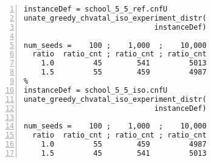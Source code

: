 \begin{table}[h!]
\vspace*{-1.1ex} 

\caption{
A statistical summary of results, based on  experiments that involve
100 isomorphs, initialized with 100 seeds, created from each of the two instances: 
{\tt school\_5\_5\_ref} and {\tt school\_5\_5\_iso}.
For the complete R-code of the stochastic greedy algorithm 
that relies on invoking any number of instance isomorphs, the algorithm
{\tt unate\_greedy\_chvatal\_iso} in
Figure~\ref{fg_bgmc_unate_greedy_chvatal_stoc}a.
However, identical results can also be generated,
using the same seeds,
with the alternative algorithm 
{\tt unate\_greedy\_chvatal\_stoc} in
Figure~\ref{fg_bgmc_unate_greedy_chvatal_stoc}b.
}
\hspace*{0.5em}
\vspace*{-1ex}
\begin{minipage}{0.40\textwidth}
\begin{Verbatim}[frame=lines, fontsize=\footnotesize,numbers=left,
numbersep=3pt,firstline=1,xleftmargin=9mm]
instanceDef = school_5_5_ref.cnfU 
unate_greedy_chvatal_iso_experiment_distr(
                              instanceDef)
                                                            
num_seeds =    100 ;    1,000  ;    10,000
  ratio  ratio_cnt ; ratio_cnt ; ratio_cnt
    1.0         45        541         5013
    1.5         55        459         4987
%
instanceDef = school_5_5_iso.cnfU 
unate_greedy_chvatal_iso_experiment_distr(
                              instanceDef)
                                                            
num_seeds =    100 ;    1,000  ;    10,000
  ratio  ratio_cnt ; ratio_cnt ; ratio_cnt
    1.0         55        459         4987
    1.5         45        541         5013
\end{Verbatim}
\end{minipage}

\label{fg_gray_02_coupon_6_markov}
\end{table}